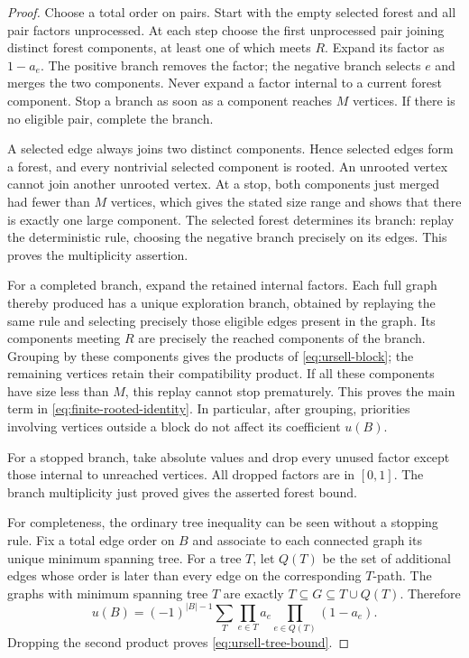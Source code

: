 \begin{proof}
Choose a total order on pairs.  Start with the empty selected forest and
all pair factors unprocessed.  At each step choose the first unprocessed
pair joining distinct forest components, at least one of which meets
$R$.  Expand its factor as $1-a_e$.  The positive branch removes the
factor; the negative branch selects $e$ and merges the two components.
Never expand a factor internal to a current forest component.  Stop a
branch as soon as a component reaches $M$ vertices.  If there is no
eligible pair, complete the branch.

A selected edge always joins two distinct components.  Hence selected
edges form a forest, and every nontrivial selected component is rooted.
An unrooted vertex cannot join another unrooted vertex.  At a stop, both
components just merged had fewer than $M$ vertices, which gives the
stated size range and shows that there is exactly one large component.
The selected forest determines its branch: replay the deterministic
rule, choosing the negative branch precisely on its edges.  This proves
the multiplicity assertion.

For a completed branch, expand the retained internal factors.  Each full
graph thereby produced has a unique exploration branch, obtained by
replaying the same rule and selecting precisely those eligible edges
present in the graph.  Its components meeting $R$ are precisely the
reached components of the branch.  Grouping by these components gives
the products of \eqref{eq:ursell-block}; the remaining vertices retain
their compatibility product.  If all these components have size less
than $M$, this replay cannot stop prematurely.  This proves the main
term in \eqref{eq:finite-rooted-identity}.  In particular, after grouping,
priorities involving vertices outside a block do not affect its
coefficient $u(B)$.

For a stopped branch, take absolute values and drop every unused factor
except those internal to unreached vertices.  All dropped factors are
in $[0,1]$.  The branch multiplicity just proved gives the asserted
forest bound.

For completeness, the ordinary tree inequality can be seen without a
stopping rule.  Fix a total edge order on $B$ and associate to each
connected graph its unique minimum spanning tree.  For a tree $T$, let
$Q(T)$ be the set of additional edges whose order is later than every
edge on the corresponding $T$-path.  The graphs with minimum spanning
tree $T$ are exactly $T\subseteq G\subseteq T\cup Q(T)$.  Therefore
\begin{equation}\label{eq:penrose-block}
 u(B)=(-1)^{|B|-1}\sum_T
       \prod_{e\in T}a_e\prod_{e\in Q(T)}(1-a_e).
\end{equation}
Dropping the second product proves \eqref{eq:ursell-tree-bound}.
\end{proof}

